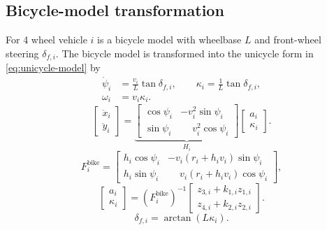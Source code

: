 \documentclass[11pt,a4paper]{article}
\begin{document}
\subsection{Bicycle-model transformation}
For 4 wheel vehicle $i$ is a bicycle model with wheelbase $L$ and front-wheel steering $\delta_{f,i}$. The bicycle model is transformed into the unicycle form in \eqref{eq:unicycle-model} by
\begin{equation}
\begin{aligned}
\dot{\psi}_i&=\frac{v_i}{L}\tan\delta_{f,i},\qquad
\kappa_i=\frac{1}{L}\tan\delta_{f,i},\\
\omega_i&=v_i\kappa_i.
\end{aligned}
\label{eq:bicycle-yaw}
\end{equation}
\begin{equation}
\begin{bmatrix}\ddot{x}_i\\\ddot{y}_i\end{bmatrix}
=
\underbrace{\begin{bmatrix}
\cos\psi_i & -v_i^2\sin\psi_i\\
\sin\psi_i & \phantom{-}v_i^2\cos\psi_i
\end{bmatrix}}_{H_i}
\begin{bmatrix}a_i\\\kappa_i\end{bmatrix}.
\label{eq:bicycle-acceleration}
\end{equation}
\begin{equation}
F_i^{\mathrm{bike}}=
\begin{bmatrix}
h_i\cos\psi_i & -v_i(r_i+h_iv_i)\sin\psi_i\\
h_i\sin\psi_i & \phantom{-}v_i(r_i+h_iv_i)\cos\psi_i
\end{bmatrix},
\label{eq:bicycle-feedback-matrix}
\end{equation}
\begin{equation}
\begin{bmatrix}a_i\\\kappa_i\end{bmatrix}
=\left(F_i^{\mathrm{bike}}\right)^{-1}
\begin{bmatrix}
z_{3,i}+k_{1,i}z_{1,i}\\
z_{4,i}+k_{2,i}z_{2,i}
\end{bmatrix}.
\label{eq:bicycle-feedback}
\end{equation}
\begin{equation}
\delta_{f,i}=\arctan(L\kappa_i).
\label{eq:steering-conversion}
\end{equation}
\end{document}
